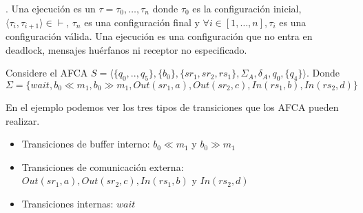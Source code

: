 




\begin{definition}. Una ejecución es un $ \tau = \tau_0, \ldots,\tau_n $ donde $\tau_0$ es la configuración inicial, $\langle \tau_i, \tau_{i+1} \rangle \in \vdash$, $\tau_n$ es una configuración final y $ \forall i \in [1, \ldots, n], \tau_i$ es una configuración válida. Una ejecución es una configuración que no entra en deadlock, mensajes huérfanos ni receptor no especificado.
\end{definition}

\begin{ejemplo}
\label{ex:AFCA}
Considere el AFCA $S= \langle \{q_0,..,q_5\},\{b_0\},\{sr_1,sr_2,rs_1\}, \Sigma_A, \delta_A, q_0, \{q_4\} \rangle$. Donde $\Sigma =\{wait, b_0 \ll m_1,b_0 \gg m_1, Out(sr_1,a),Out(sr_2,c), In(rs_1,b),In(rs_2,d) \}$
\begin{center}
\end{center}
En el ejemplo podemos ver los tres tipos de transiciones que los AFCA pueden realizar. 

\begin{itemize}
    \item Transiciones de buffer interno: $b_0 \ll m_1$ y $b_0 \gg m_1$
    \item Transiciones de comunicación externa: $Out(sr_1,a),Out(sr_2,c), In(rs_1,b)$ y $In(rs_2,d) $
    \item Transiciones internas: $wait$
\end{itemize}
\end{ejemplo}

